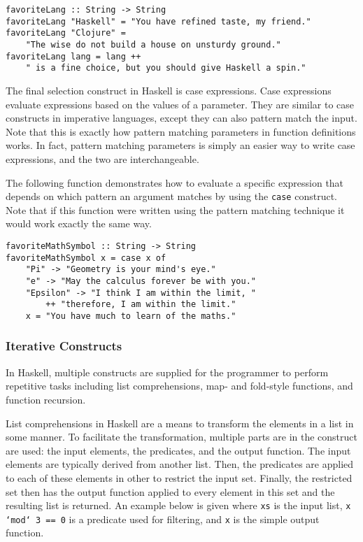 \documentclass[titlepage,12pt]{article}
\begin{document}
\begin{verbatim}
favoriteLang :: String -> String
favoriteLang "Haskell" = "You have refined taste, my friend."
favoriteLang "Clojure" = 
    "The wise do not build a house on unsturdy ground."
favoriteLang lang = lang ++ 
    " is a fine choice, but you should give Haskell a spin."
\end{verbatim}

The final selection construct in Haskell is case expressions. Case expressions evaluate expressions based on 
the values of a parameter. They are similar to case constructs in imperative languages, except they can also pattern 
match the input. Note that this is exactly how pattern matching parameters in function definitions works. In 
fact, pattern matching parameters is simply an easier way to write case expressions, and the two are interchangeable. 

The following function demonstrates how to evaluate a specific expression that depends on which pattern 
an argument matches by using the \texttt{case} construct. Note that if this function were written using the 
pattern matching technique it would work exactly the same way. 

\begin{verbatim}
favoriteMathSymbol :: String -> String
favoriteMathSymbol x = case x of
    "Pi" -> "Geometry is your mind's eye."
    "e" -> "May the calculus forever be with you."
    "Epsilon" -> "I think I am within the limit, "
        ++ "therefore, I am within the limit."
    x = "You have much to learn of the maths."
\end{verbatim}

\subsubsection{Iterative Constructs}

In Haskell, multiple constructs are supplied for the programmer to perform repetitive tasks including
list comprehensions, map- and fold-style functions, and function recursion.

List comprehensions in Haskell are a means to transform the elements in a list in some manner.
To facilitate the transformation, multiple parts are in the construct are used: the input elements, the
predicates, and the output function.  The input elements are typically derived from another list.  Then,
the predicates are applied to each of these elements in other to restrict the input set.  Finally, the
restricted set then has the output function applied to every element in this set and the resulting list
is returned.  An example below is given where \texttt{xs} is the input list, \texttt{x `mod` 3 == 0} is
a predicate used for filtering, and \texttt{x} is the simple output function.
\end{document}
